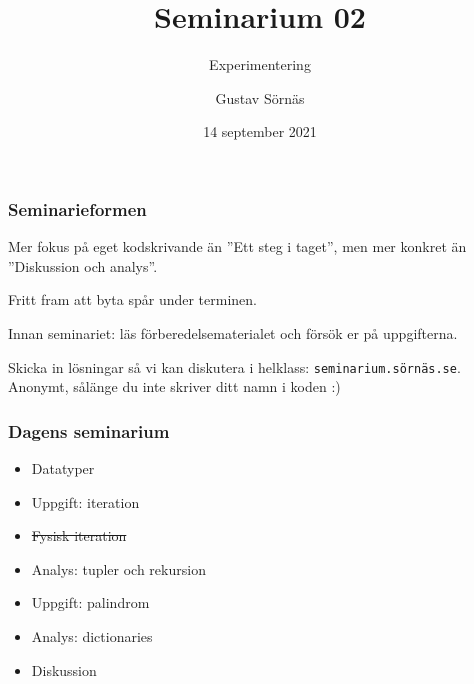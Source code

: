 \documentclass{beamer}
\title{Seminarium 02}
\subtitle{Experimentering}
\date{14 september 2021}
\author{Gustav Sörnäs}
\begin{document}
  \frame{\titlepage}

  \begin{frame}
    \frametitle{Seminarieformen}

    Mer fokus på eget kodskrivande än ''Ett steg i taget'', men mer konkret än
    ''Diskussion och analys''.

    Fritt fram att byta spår under terminen.

    Innan seminariet: läs förberedelsematerialet och försök er på uppgifterna.

    Skicka in lösningar så vi kan diskutera i helklass:
    \texttt{seminarium.sörnäs.se}. Anonymt, sålänge du inte skriver ditt namn i
    koden :)

  \end{frame}

  \begin{frame}
    \frametitle{Dagens seminarium}

    \begin{itemize}
      \item Datatyper
      \item Uppgift: iteration
      \item \sout{Fysisk iteration}
      \item Analys: tupler och rekursion
      \item Uppgift: palindrom
      \item Analys: dictionaries
      \item Diskussion
    \end{itemize}

  \end{frame}
\end{document}
